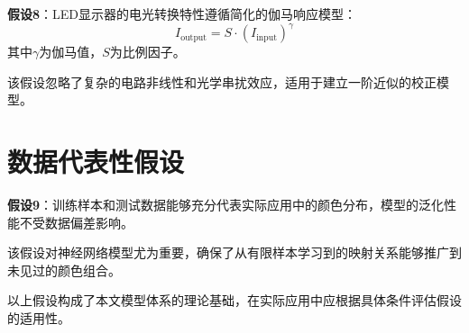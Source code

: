 \textbf{假设8}：LED显示器的电光转换特性遵循简化的伽马响应模型：
$$I_{\text{output}} = S \cdot (I_{\text{input}})^{\gamma}$$
其中$\gamma$为伽马值，$S$为比例因子。

该假设忽略了复杂的电路非线性和光学串扰效应，适用于建立一阶近似的校正模型。

\section[\hspace{-2pt}数据代表性假设]{{\heiti{} \hspace{-8pt}数据代表性假设}}\label{section2: 数据代表性假设}

\textbf{假设9}：训练样本和测试数据能够充分代表实际应用中的颜色分布，模型的泛化性能不受数据偏差影响。

该假设对神经网络模型尤为重要，确保了从有限样本学习到的映射关系能够推广到未见过的颜色组合。

以上假设构成了本文模型体系的理论基础，在实际应用中应根据具体条件评估假设的适用性。

